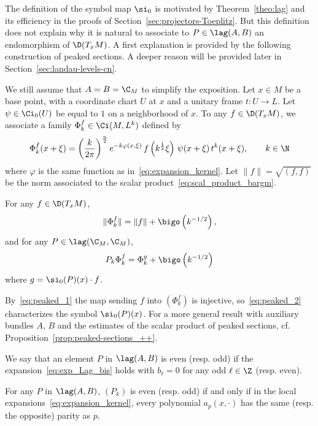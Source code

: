 The definition of the symbol map $\si_0$ is motivated by Theorem~\ref{theo:lag} and its efficiency in the proofs of Section~\ref{sec:projectors-Toeplitz}. But this definition does not explain why it is natural to associate to $P \in \lag (A,B)$ an endomorphism of $\D (T_xM)$. A first explanation is provided by the following construction of peaked sections. A deeper reason will be provided later in Section~\ref{sec:landau-levels-cn}.

We still assume that $A = B = \C_M$ to simplify the exposition. Let $x \in M$ be a base point, with a coordinate chart $U$ at $x$ and a unitary frame $t: U \rightarrow L$. Let $\psi \in \Ci_0(U)$ be equal to $1$ on a neighborhood of $x$. To any $f \in \D (T_xM)$, we associate a family $\Phi_k^f \in \Ci (M, L^k)$ defined by
\[
\Phi_k^f (x+\xi) = \left(\frac{k}{2\pi} \right)^{\frac{n}{2}} e^{-k
\varphi(x,\xi)} \, f\left(k^{\frac{1}{2}} \xi\right) \, \psi (x+\xi) \, t
^k(x+\xi), \qquad k \in \N
\]
where $\varphi$ is the same function as in~\eqref{eq:expansion_kernel}.  Let $\| f \| = \sqrt{(f,f)}$ be the norm associated to the scalar product~\eqref{eq:scal_product_bargm}. 

\begin{prop}\label{prop:peaked-sections}
For any $f \in \D (T_xM)$,
\begin{gather}\label{eq:peaked_1}
\| \Phi^f_k \| = \| f \| + \bigo \left(k^{-1/2}\right),
\end{gather}
and for any $P \in \lag (\C_M, \C_M)$,
\begin{gather}\label{eq:peaked_2}
P_k \Phi^f_k = \Phi^g_k + \bigo \left(k^{-1/2}\right)
\end{gather}
where $g = \si_0(P)(x) \cdot f$.
\end{prop}

By~\eqref{eq:peaked_1} the map sending $f$ into $(\Phi_k^f)$ is injective, so~\eqref{eq:peaked_2} characterizes the symbol $\si_0 (P) (x)$. For a more general result with auxiliary bundles $A$, $B$ and the estimates of the scalar product of peaked sections, cf. Proposition~\ref{prop:peaked-sections_++}.

We say that an element $P$ in $\lag (A,B)$ is even (resp. odd) if the expansion~\eqref{eq:exp_Lag_bis} holds with $b_{\ell } = 0$ for any odd $\ell \in \Z$ (resp. even).

\begin{lemm}\label{lem:parite}
For any $P$ in $\lag (A,B)$, $(P_k)$ is even (resp. odd) if and only if in the local expansions~\eqref{eq:expansion_kernel}, every polynomial $a_p(x,\cdot)$ has the same (resp. the opposite) parity as $p$.
\end{lemm}


